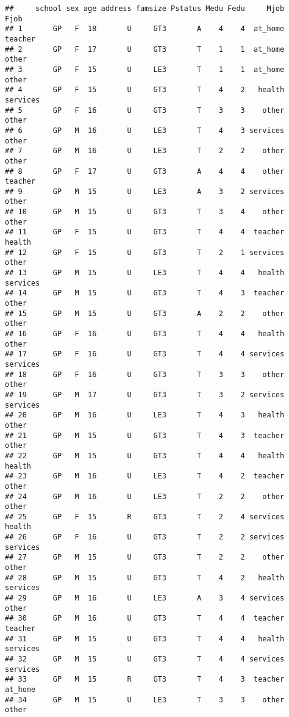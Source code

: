 \documentclass[
]{article}
\begin{document}
\begin{verbatim}
##     school sex age address famsize Pstatus Medu Fedu     Mjob     Fjob
## 1       GP   F  18       U     GT3       A    4    4  at_home  teacher
## 2       GP   F  17       U     GT3       T    1    1  at_home    other
## 3       GP   F  15       U     LE3       T    1    1  at_home    other
## 4       GP   F  15       U     GT3       T    4    2   health services
## 5       GP   F  16       U     GT3       T    3    3    other    other
## 6       GP   M  16       U     LE3       T    4    3 services    other
## 7       GP   M  16       U     LE3       T    2    2    other    other
## 8       GP   F  17       U     GT3       A    4    4    other  teacher
## 9       GP   M  15       U     LE3       A    3    2 services    other
## 10      GP   M  15       U     GT3       T    3    4    other    other
## 11      GP   F  15       U     GT3       T    4    4  teacher   health
## 12      GP   F  15       U     GT3       T    2    1 services    other
## 13      GP   M  15       U     LE3       T    4    4   health services
## 14      GP   M  15       U     GT3       T    4    3  teacher    other
## 15      GP   M  15       U     GT3       A    2    2    other    other
## 16      GP   F  16       U     GT3       T    4    4   health    other
## 17      GP   F  16       U     GT3       T    4    4 services services
## 18      GP   F  16       U     GT3       T    3    3    other    other
## 19      GP   M  17       U     GT3       T    3    2 services services
## 20      GP   M  16       U     LE3       T    4    3   health    other
## 21      GP   M  15       U     GT3       T    4    3  teacher    other
## 22      GP   M  15       U     GT3       T    4    4   health   health
## 23      GP   M  16       U     LE3       T    4    2  teacher    other
## 24      GP   M  16       U     LE3       T    2    2    other    other
## 25      GP   F  15       R     GT3       T    2    4 services   health
## 26      GP   F  16       U     GT3       T    2    2 services services
## 27      GP   M  15       U     GT3       T    2    2    other    other
## 28      GP   M  15       U     GT3       T    4    2   health services
## 29      GP   M  16       U     LE3       A    3    4 services    other
## 30      GP   M  16       U     GT3       T    4    4  teacher  teacher
## 31      GP   M  15       U     GT3       T    4    4   health services
## 32      GP   M  15       U     GT3       T    4    4 services services
## 33      GP   M  15       R     GT3       T    4    3  teacher  at_home
## 34      GP   M  15       U     LE3       T    3    3    other    other

\end{verbatim}
\end{document}
